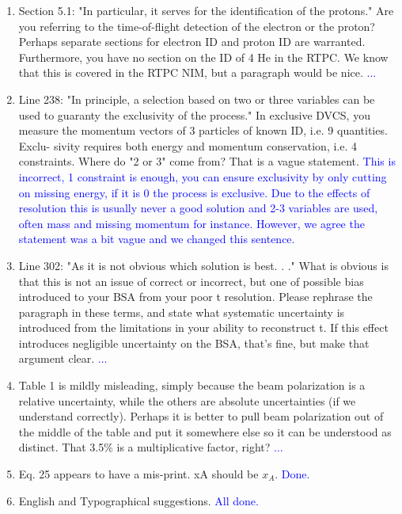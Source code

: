 \documentclass[a4paper,11pt,twoside]{article}
\begin{document}
\begin{enumerate}
\item  Section 5.1: "In particular, it serves for the identification of the protons."
Are you referring to the time-of-flight detection of the electron or the proton? Perhaps separate sections for
electron ID and proton ID are warranted. Furthermore, you have no section on the ID of 4 He in the RTPC.
We know that this is covered in the RTPC NIM, but a paragraph would be nice.
   \textcolor{blue}{...}

\item  Line 238: "In principle, a selection based on two or three variables can be used to guaranty the exclusivity of
the process."
In exclusive DVCS, you measure the momentum vectors of 3 particles of known ID, i.e. 9 quantities. Exclu-
sivity requires both energy and momentum conservation, i.e. 4 constraints. Where do "2 or 3" come from?
That is a vague statement.
   \textcolor{blue}{This is incorrect, 1 constraint is enough, you can ensure exclusivity by only cutting on missing 
energy, if it is 0 the process is exclusive. Due to the effects of resolution this is usually never a good solution
and 2-3 variables are used, often mass and missing momentum for instance. However, we agree the statement was a bit 
vague and we changed this sentence.}

\item  Line 302: "As it is not obvious which solution is best. . ."
What is obvious is that this is not an issue of correct or incorrect, but one of possible bias introduced to your
BSA from your poor t resolution. Please rephrase the paragraph in these terms, and state what systematic
uncertainty is introduced from the limitations in your ability to reconstruct t. If this effect introduces negligible
uncertainty on the BSA, that's fine, but make that argument clear.
   \textcolor{blue}{...}

\item  Table 1 is mildly misleading, simply because the beam polarization is a relative uncertainty, while the others
are absolute uncertainties (if we understand correctly). Perhaps it is better to pull beam polarization out of
the middle of the table and put it somewhere else so it can be understood as distinct.
That 3.5\% is a multiplicative factor, right?
   \textcolor{blue}{...}

\item  Eq. 25 appears to have a mis-print. xA should be $x_A$.
   \textcolor{blue}{Done.}

\item  English and Typographical suggestions.
   \textcolor{blue}{All done.}

\end{enumerate}
\end{document}
